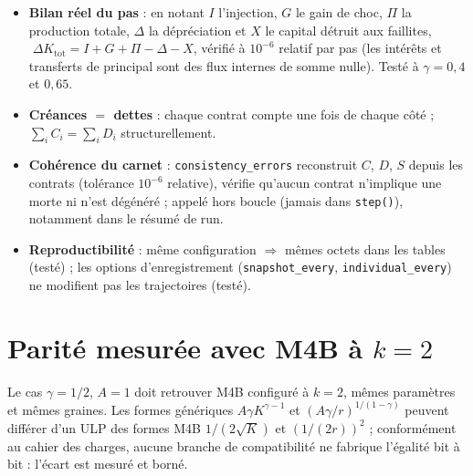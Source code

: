 \documentclass[11pt,a4paper]{article}
\newcommand{\code}[1]{\texttt{#1}}
\begin{document}
\begin{itemize}
\item \textbf{Bilan réel du pas} : en notant $I$ l'injection, $G$ le gain
de choc, $\Pi$ la production totale, $\Delta$ la dépréciation et $X$ le
capital détruit aux faillites,
$\;\Delta K_{\mathrm{tot}}=I+G+\Pi-\Delta-X$, vérifié à $10^{-6}$ relatif
par pas (les intérêts et transferts de principal sont des flux internes de
somme nulle). Testé à $\gamma=0{,}4$ et $0{,}65$.
\item \textbf{Créances $=$ dettes} : chaque contrat compte une fois de
chaque côté ; $\sum_i C_i=\sum_i D_i$ structurellement.
\item \textbf{Cohérence du carnet} : \code{consistency\_errors} reconstruit
$C$, $D$, $S$ depuis les contrats (tolérance $10^{-6}$ relative), vérifie
qu'aucun contrat n'implique une morte ni n'est dégénéré ; appelé hors
boucle (jamais dans \code{step()}), notamment dans le résumé de run.
\item \textbf{Reproductibilité} : même configuration $\Rightarrow$ mêmes
octets dans les tables (testé) ; les options d'enregistrement
(\code{snapshot\_every}, \code{individual\_every}) ne modifient pas les
trajectoires (testé).
\end{itemize}

\section{Parité mesurée avec M4B à $k=2$}
\label{sec:parity}

Le cas $\gamma=1/2$, $A=1$ doit retrouver M4B configuré à $k=2$, mêmes
paramètres et mêmes graines. Les formes génériques
$A\gamma K^{\gamma-1}$ et $(A\gamma/r)^{1/(1-\gamma)}$ peuvent différer
d'un ULP des formes M4B $1/(2\sqrt K)$ et $(1/(2r))^2$ ; conformément au
cahier des charges, aucune branche de compatibilité ne fabrique l'égalité
bit à bit : l'écart est mesuré et borné.
\end{document}
